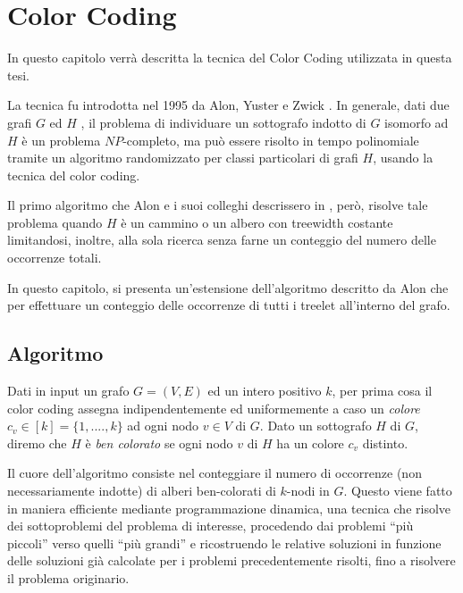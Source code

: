 \chapter{Color Coding}
\label{cap 2}
In questo capitolo verr\`a descritta la tecnica del Color Coding utilizzata in questa tesi.

La tecnica fu introdotta nel 1995 da Alon, Yuster e Zwick \cite{alon1995color}.
In generale, dati due grafi $G$ ed $ H $ , il problema di individuare un sottografo indotto di $ G $ isomorfo ad $ H $ \`e un problema $ NP $-completo, ma pu\`o essere risolto in tempo polinomiale tramite un algoritmo randomizzato per classi particolari di grafi $ H $, usando la tecnica del color coding.

Il primo algoritmo che Alon e i suoi colleghi descrissero in \cite{alon1995color} , per\`o, risolve tale problema quando $ H $ \`e un cammino o un albero con treewidth costante limitandosi, inoltre, alla sola ricerca senza farne un conteggio del numero delle occorrenze totali.
 
In questo capitolo, si presenta un'estensione dell'algoritmo descritto da Alon \cite{alon1995color,bressan2018motif} che per effettuare un conteggio delle occorrenze di tutti i treelet all'interno del grafo.\\




\section{Algoritmo}
\label{section1}

Dati in input un grafo $ G=(V,E) $ ed un intero positivo $ k $, per prima cosa il color coding assegna indipendentemente ed uniformemente a caso un \emph{colore}  $c_v \in [k] = \{1,....,k\} $ ad ogni nodo  $ v\in V $ di $ G $.
Dato un sottografo $H$ di $G$, diremo che $H$ è \emph{ben colorato} se ogni nodo $v$ di $H$ ha un colore $c_v$ distinto.

Il cuore dell'algoritmo consiste nel conteggiare il numero di occorrenze (non necessariamente indotte) di alberi ben-colorati di $k$-nodi in $ G $.
Questo viene fatto in maniera efficiente mediante programmazione dinamica, una tecnica che risolve dei sottoproblemi del problema di interesse, procedendo dai problemi ``pi\`u piccoli'' verso quelli ``pi\`u grandi'' e ricostruendo le relative soluzioni in funzione delle soluzioni già calcolate per i problemi precedentemente risolti, fino a risolvere il problema originario.

